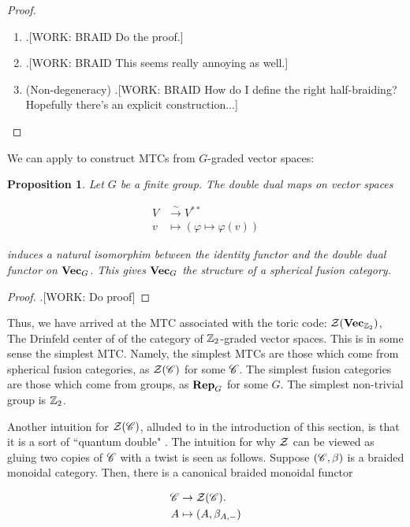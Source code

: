 \documentclass{article}
\newtheorem{proposition}{Proposition}[section]
\theoremstyle{definition}
\numberwithin{figure}{section}
\begin{document}
\begin{enumerate}[\thesection .1.]
\begin{proof}
\begin{enumerate}
\item .[WORK: BRAID Do the proof.]

\item .[WORK: BRAID This seems really annoying as well.]

\item (Non-degeneracy) .[WORK: BRAID How do I define the right half-braiding? Hopefully there's an explicit construction...]
\end{enumerate}
\end{proof}

We can apply to construct MTCs from $G$-graded vector spaces:

\begin{proposition} Let $G$ be a finite group. The double dual maps on vector spaces

\begin{align*}
V&\xrightarrow{\sim}V^{**}\\
v&\mapsto (\varphi\mapsto \varphi(v))
\end{align*}

induces a natural isomorphim between the identity functor and the double dual functor on $\bold{Vec}_G$. This gives $\bold{Vec}_G$ the structure of a spherical fusion category.
\end{proposition}
\begin{proof}.[WORK: Do proof]
\end{proof}

Thus, we have arrived at the MTC associated with the toric code: $\mathcal{Z}(\bold{Vec}_{\mathbb{Z}_2})$, The Drinfeld center of of the category of $\mathbb{Z}_2$-graded vector spaces. This is in some sense the simplest MTC. Namely, the simplest MTCs are those which come from spherical fusion categories,  as $\mathcal{Z}(\mathscr{C})$ for some $\mathscr{C}$. The simplest fusion categories are those which come from groups, as $\bold{Rep}_G$ for some $G$. The simplest non-trivial group is $\mathbb{Z}_2$.

Another intuition for $\mathcal{Z}(\mathscr{C})$, alluded to in the introduction of this section, is that it is a sort of ``quantum double" \cite{felice2017hopf}. The intuition for why $\mathcal{Z}$ can be viewed as gluing two copies of $\mathscr{C}$ with a twist is seen as follows. Suppose $(\mathscr{C},\beta)$ is a braided monoidal category. Then, there is a canonical braided monoidal functor

\begin{align*}
\mathscr{C} &\to \mathcal{Z}(\mathscr{C}).\\
A &\mapsto (A,\beta_{A,\--})
\end{align*}


\end{enumerate}
\end{document}
